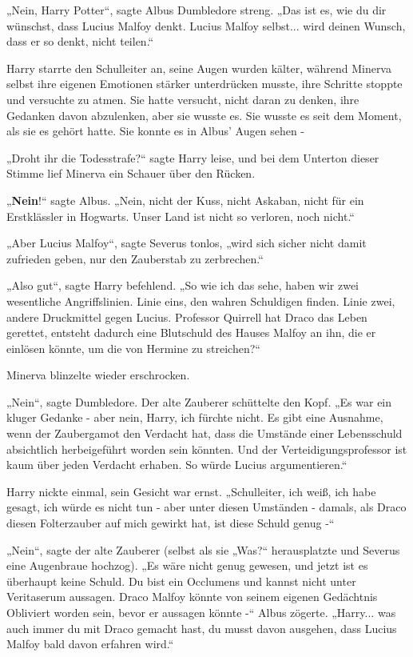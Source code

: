 {„Nein, Harry Potter“, sagte Albus Dumbledore streng. „Das ist es, wie du dir wünschst, dass Lucius Malfoy denkt. Lucius Malfoy selbst... wird deinen Wunsch, dass er so denkt, nicht teilen.“

Harry starrte den Schulleiter an, seine Augen wurden kälter, während Minerva selbst ihre eigenen Emotionen stärker unterdrücken musste, ihre Schritte stoppte und versuchte zu atmen. Sie hatte versucht, nicht daran zu denken, ihre Gedanken davon abzulenken, aber sie wusste es. Sie wusste es seit dem Moment, als sie es gehört hatte. Sie konnte es in Albus' Augen sehen -

„Droht ihr die Todesstrafe?“ sagte Harry leise, und bei dem Unterton dieser Stimme lief Minerva ein Schauer über den Rücken.

„\textbf{Nein}!“ sagte Albus. „Nein, nicht der Kuss, nicht Askaban, nicht für ein Erstklässler in Hogwarts. Unser Land ist nicht so verloren, noch nicht.“

„Aber Lucius Malfoy“, sagte Severus tonlos, „wird sich sicher nicht damit zufrieden geben, nur den Zauberstab zu zerbrechen.“

„Also gut“, sagte Harry befehlend. „So wie ich das sehe, haben wir zwei wesentliche Angriffslinien. Linie eins, den wahren Schuldigen finden. Linie zwei, andere Druckmittel gegen Lucius. Professor Quirrell hat Draco das Leben gerettet, entsteht dadurch eine Blutschuld des Hauses Malfoy an ihn, die er einlösen könnte, um die von Hermine zu streichen?“

Minerva blinzelte wieder erschrocken.

„Nein“, sagte Dumbledore. Der alte Zauberer schüttelte den Kopf. „Es war ein kluger Gedanke - aber nein, Harry, ich fürchte nicht. Es gibt eine Ausnahme, wenn der Zaubergamot den Verdacht hat, dass die Umstände einer Lebensschuld absichtlich herbeigeführt worden sein könnten. Und der Verteidigungsprofessor ist kaum über jeden Verdacht erhaben. So würde Lucius argumentieren.“

Harry nickte einmal, sein Gesicht war ernst. „Schulleiter, ich weiß, ich habe gesagt, ich würde es nicht tun - aber unter diesen Umständen - damals, als Draco diesen Folterzauber auf mich gewirkt hat, ist diese Schuld genug -“

„Nein“, sagte der alte Zauberer (selbst als sie „Was?“ herausplatzte und Severus eine Augenbraue hochzog). „Es wäre nicht genug gewesen, und jetzt ist es überhaupt keine Schuld. Du bist ein Occlumens und kannst nicht unter Veritaserum aussagen. Draco Malfoy könnte von seinem eigenen Gedächtnis Obliviert worden sein, bevor er aussagen könnte -“ Albus zögerte. „Harry... was auch immer du mit Draco gemacht hast, du musst davon ausgehen, dass Lucius Malfoy bald davon erfahren wird.“

}
